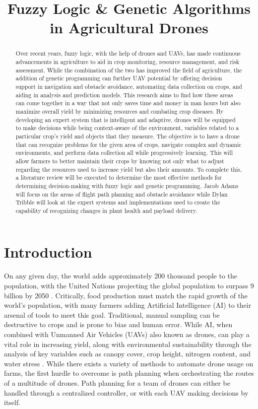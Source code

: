 \documentclass{IEEEtran}
\title{Fuzzy Logic \& Genetic Algorithms in Agricultural Drones}
\author{
    \IEEEauthorblockN{Dylan Tribble}
    \and
    \IEEEauthorblockN{Jacob Adams}
}
\begin{document}
\maketitle
\begin{abstract}
Over recent years, fuzzy logic, with the help of drones and UAVs, has made continuous advancements in agriculture to aid in crop monitoring, resource management, and risk assessment. While the combination of the two has improved the field of agriculture, the addition of genetic programming can further UAV potential by offering decision support in navigation and obstacle avoidance, automating data collection on crops, and aiding in analysis and prediction models. This research aims to find how these areas can come together in a way that not only saves time and money in man hours but also maximize overall yield by minimizing resources and combating crop diseases. By developing an expert system that is intelligent and adaptive, drones will be equipped to make decisions while being context-aware of the environment, variables related to a particular crop's yield and objects that they measure. The objective is to have a drone that can recognize problems for the given area of crops, navigate complex and dynamic environments, and perform data collection all while progressively learning. This will allow farmers to better maintain their crops by knowing not only what to adjust regarding the resources used to increase yield but also their amounts. To complete this, a literature review will be executed to determine the most effective methods for determining decision-making with fuzzy logic and genetic programming. Jacob Adams will focus on the areas of flight path planning and obstacle avoidance while Dylan Tribble will look at the expert systems and implementations used to create the capability of recognizing changes in plant health and payload delivery. 
\end{abstract}

\section{Introduction}
On any given day, the world adds approximately 200 thousand people to the population, with the United Nations projecting the global population to surpass 9 billion by 2050 \cite{key9} \cite{United_Nations}.
Critically, food production must match the rapid growth of the world's population, with many farmers adding Artificial Intelligence (AI) to their arsenal of tools to meet this goal. Traditional, manual sampling
can be destructive to crops and is prone to bias and human error. While AI, when combined with Unmanned Air Vehicles (UAVs) also known as drones, can play a vital role in increasing yield, along with environmental
sustainability through the analysis of key variables such as canopy cover, crop height, nitrogen content, and water stress \cite{key7}. While there exists a variety of methods to automate drone usage on farms,
the first hurdle to overcome is path planning when orchestrating the routes of a multitude of drones. Path planning for a team of drones can either be handled through a centralized controller, or with each UAV making decisions
by itself.
\end{document}
